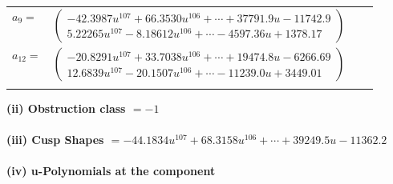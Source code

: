 \documentclass[1p]{elsarticle_modified}
\theoremstyle{definition}
\begin{document}
\begin{tabular}{m{7pt} m{180pt} m{7pt} m{180pt} }
\flushright $a_{9}=$&$\begin{pmatrix}-42.3987 u^{107}+66.3530 u^{106}+\cdots+37791.9 u-11742.9\\5.22265 u^{107}-8.18612 u^{106}+\cdots-4597.36 u+1378.17\end{pmatrix}$ \\
\flushright $a_{12}=$&$\begin{pmatrix}-20.8291 u^{107}+33.7038 u^{106}+\cdots+19474.8 u-6266.69\\12.6839 u^{107}-20.1507 u^{106}+\cdots-11239.0 u+3449.01\end{pmatrix}$\\&\end{tabular}
\flushleft \textbf{(ii) Obstruction class $= -1$}\\~\\
\flushleft \textbf{(iii) Cusp Shapes $= -44.1834 u^{107}+68.3158 u^{106}+\cdots+39249.5 u-11362.2$}\\~\\
\newpage\renewcommand{\arraystretch}{1}
\flushleft \textbf{(iv) u-Polynomials at the component}\newline \\
\end{document}
